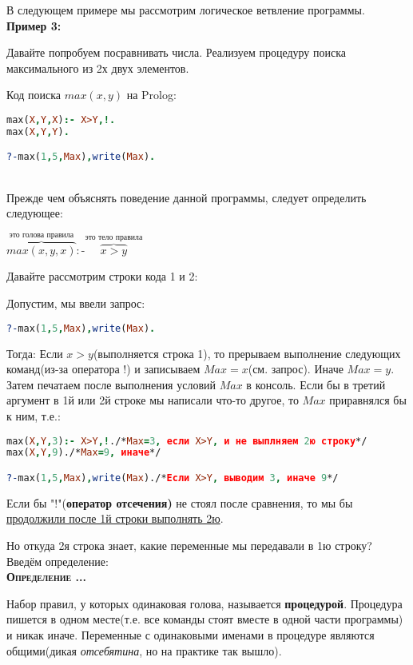 \documentclass[18pt, a4paper]{extarticle}
\newcounter{par}
\newcounter{spar}
\newcounter{zap}
\newcommand{\opr}{\textbf{\textsc{Определение \thepar.\if\thespar1\thespar.\fi\thezap.\;}}\stepcounter{zap}}
\newcommand{\primerT}[1]{\textbf{Пример #1:\;}}
\newcommand{\toPr}{:\!\!\text{-}}
\begin{document}
В следующем примере мы рассмотрим логическое ветвление программы.\\

\primerT 3

Давайте попробуем посравнивать числа. Реализуем процедуру поиска максимального из 2х двух элементов.

Код поиска $max(x,y)$ на Prolog:
\begin{lstlisting}[language=Prolog,mathescape,basicstyle=\ttfamily\footnotesize]
max(X,Y,X):- X>Y,!.
max(X,Y,Y).

?-max(1,5,Max),write(Max).
\end{lstlisting}\leavevmode\\

\newpage
Прежде чем объяснять поведение данной программы, следует определить следующее:
\begin{center}
    $\overset{\text{это голова правила}}{\overbrace{max(x,y,x)}}\toPr\overset{\text{это тело правила}}{\overbrace{x>y}}$
\end{center}

Давайте рассмотрим строки кода 1 и 2:

Допустим, мы ввели запрос:
\begin{lstlisting}[language=Prolog,mathescape,basicstyle=\ttfamily\footnotesize]
?-max(1,5,Max),write(Max).
\end{lstlisting}
Тогда:
Если $x > y$(выполняется строка 1), то прерываем выполнение следующих команд(из-за оператора !) и записываем $Max=x$(см. запрос).
Иначе $Max = y$. Затем печатаем после выполнения условий $Max$ в консоль. Если бы в третий аргумент в 1й или 2й строке мы написали что-то другое, то $Max$ приравнялся бы к ним, т.е.:

\begin{lstlisting}[language=Prolog,mathescape,basicstyle=\ttfamily\footnotesize]
max(X,Y,3):- X>Y,!./*Max=3, если X>Y, и не выплняем 2ю строку*/
max(X,Y,9)./*Max=9, иначе*/

?-max(1,5,Max),write(Max)./*Если X>Y, выводим 3, иначе 9*/
\end{lstlisting}

Если бы "!"{}(\textbf{оператор отсечения)} не стоял после сравнения, то мы бы \underline{продолжили после 1й строки выполнять 2ю}.

Но откуда 2я строка знает, какие переменные мы передавали в 1ю строку? Введём определение:\\

\opr 

Набор правил, у которых одинаковая голова, называется \textbf{процедурой}.
Процедура пишется в одном месте(т.е. все команды стоят вместе в одной части программы) и никак иначе. Переменные с одинаковыми именами в процедуре являются общими(дикая \textit{отсебятина}, но на практике так вышло).\\
\end{document}
